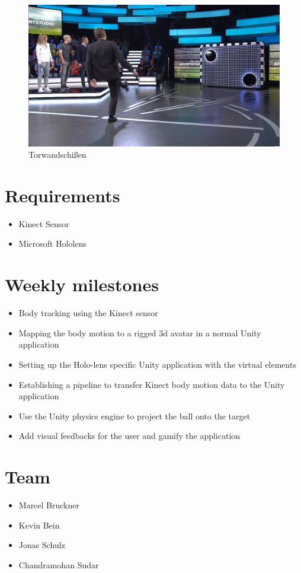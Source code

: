\documentclass[a4paper,pagesize 10pt]{scrartcl}
\begin{document}
\begin{figure}[h]
	\centering
	\includegraphics[width=0.7\linewidth]{torwandschiessen.jpeg}
	\caption{Torwandschißen}
	\label{fig:overview}
\end{figure}

\section{Requirements}
\begin{itemize}	
	\item Kinect Sensor
  \item Microsoft Hololens
\end{itemize}

\section{Weekly milestones}
\begin{itemize}	
  \item Body tracking using the Kinect sensor
  \item Mapping the body motion to a rigged 3d avatar in a normal Unity application
  \item Setting up the Holo-lens specific Unity application with the virtual elements
  \item Establishing a pipeline to transfer Kinect body motion data to the Unity application
  \item Use the Unity physics engine to project the ball onto the target
  \item Add visual feedbacks for the user and gamify the application
\end{itemize}


\section{Team}
\begin{itemize}
\item Marcel Bruckner
\item Kevin Bein
\item Jonas Schulz
\item Chandramohan Sudar
\end{itemize}


{\small
	
	
}
\end{document}

